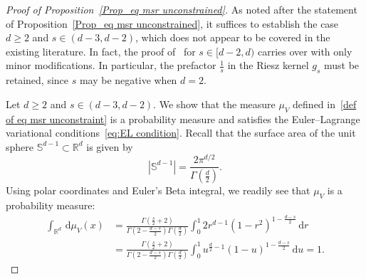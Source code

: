 \documentclass{amsart}
\def\R{\mathbb{R}}
\newcommand{\ud}{\, \mathrm{d}}
\theoremstyle{plain}
\theoremstyle{remark}
\numberwithin{equation}{section}
\begin{document}
\begin{proof}[Proof of Proposition~\ref{Prop_eq msr unconstrained}]
As noted after the statement of Proposition~\ref{Prop_eq msr unconstrained}, it suffices to establish the case $d \ge 2$ and $s\in(d-3,d-2)$, which does not appear to be covered in the existing literature. In fact, the proof of~\cite{BFMS26} for $s\in[d-2,d)$ carries over with only minor modifications. In particular, the prefactor $\frac{1}{s}$ in the Riesz kernel $g_s$ must be retained, since $s$ may be negative when $d=2$.
 
Let $d\ge2$ and $s\in(d-3,d-2)$. We show that the measure $\mu_V$ defined in~\eqref{def of eq msr unconstraint} is a probability measure and satisfies the Euler--Lagrange variational conditions~\eqref{eq:EL condition}.  
Recall that the surface area of the unit sphere $\mathbb{S}^{d-1}\subset\mathbb{R}^d$ is given by 
\begin{equation}
\label{eq:surface area}
    |\mathbb{S}^{d-1}| = \frac{2\pi^{d/2}} {\Gamma(\frac{d}{2})}.
\end{equation}
Using polar coordinates and Euler's Beta integral, we readily see that $\mu_V$ is a probability measure:
\begin{align*}
    \int_{\R^{d}} \ud\mu_V(x) 
    &= \frac{\Gamma(\frac{s}{2}+2)}{\Gamma(2-\frac{d-s}{2})\Gamma(\frac{d}{2})} \int_0^1 2r^{d-1}(1-r^2)^{1-\frac{d-s}{2}} \ud r\\
    &= \frac{\Gamma(\frac{s}{2}+2)}{\Gamma(2-\frac{d-s}{2})\Gamma(\frac{d}{2})}\int_0^1 u^{\frac{d}{2}-1}(1-u)^{1-\frac{d-s}{2}} \ud u=1. 
\end{align*}
 


\end{proof}
\end{document}
